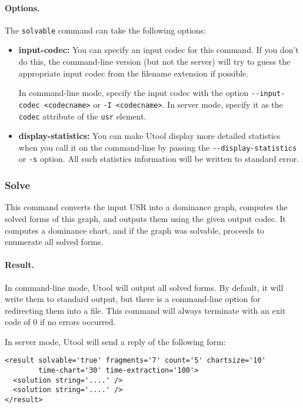 \paragraph{Options.}
The \verb?solvable? command can take the following options:
\begin{itemize}
\item \textbf{input-codec:} You can specify an input codec for this
command. If you don't do this, the command-line version (but not the
server) will try to guess the appropriate input codec from the
filename extension if possible.

In command-line mode, specify the input codec with the option
\verb?--input-codec <codecname>? or \verb?-I <codecname>?. In server
mode, specify it as the \verb?codec? attribute of the \verb?usr?
element.

\item \textbf{display-statistics:} You can make Utool display more detailed
statistics when you call it on the command-line by passing the
\verb?--display-statistics? or \verb?-s? option. All such statistics
information will be written to standard error.
\end{itemize}



\subsubsection{Solve}

This command converts the input USR into a dominance graph, computes
the solved forms of this graph, and outputs them using the given
output codec. It computes a dominance chart, and if the graph was
solvable, proceeds to enumerate all solved forms.


\paragraph{Result.}
In command-line mode, Utool will output all solved forms. By default,
it will write them to standard output, but there is a command-line
option for redirecting them into a file. This command will always
terminate with an exit code of 0 if no errors occurred.

In server mode, Utool will send a reply of the following form:
\begin{verbatim}
<result solvable='true' fragments='7' count='5' chartsize='10'
        time-chart='30' time-extraction='100'>
  <solution string='....' />
  <solution string='....' />
</result>
\end{verbatim}


